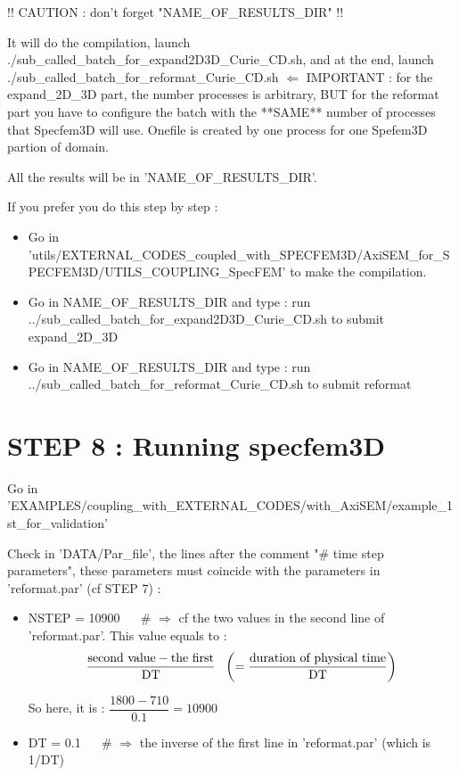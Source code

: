 \documentclass[11pt]{article}
\newcommand{\ds}{\displaystyle}
\begin{document}
\noindent !! CAUTION : don't forget "NAME\_OF\_RESULTS\_DIR" !!

\medskip

\noindent It will do the compilation, launch ./sub\_called\_batch\_for\_expand2D3D\_Curie\_CD.sh, and at the end, launch ./sub\_called\_batch\_for\_reformat\_Curie\_CD.sh $\Longleftarrow$ IMPORTANT : for the expand\_2D\_3D part, the number processes is arbitrary, BUT for the reformat part you have to configure the batch with the **SAME** number of processes that Specfem3D will use. Onefile is created by one process for one Spefem3D partion of domain.

\smallskip

\noindent All the results will be in 'NAME\_OF\_RESULTS\_DIR'.

\bigskip

\noindent If you prefer you do this step by step :

\begin{itemize}

\item[\textbullet] Go in {\scriptsize 'utils/EXTERNAL\_CODES\_coupled\_with\_SPECFEM3D/AxiSEM\_for\_SPECFEM3D/UTILS\_COUPLING\_SpecFEM'} to make the compilation.
\item[\textbullet] Go in NAME\_OF\_RESULTS\_DIR and type : run ../sub\_called\_batch\_for\_expand2D3D\_Curie\_CD.sh to submit expand\_2D\_3D
\item[\textbullet] Go in NAME\_OF\_RESULTS\_DIR and type : run ../sub\_called\_batch\_for\_reformat\_Curie\_CD.sh to submit reformat

\end{itemize}

\section{STEP 8 : Running specfem3D}

\noindent Go in 'EXAMPLES/coupling\_with\_EXTERNAL\_CODES/with\_AxiSEM/example\_1st\_for\_validation'

\medskip 

\noindent Check in 'DATA/Par\_file', the lines after the comment "\# time step parameters", these parameters must coincide with the parameters in  'reformat.par' (cf STEP 7) :

\begin{itemize}

\item[\textbullet] NSTEP = 10900 ~~ \# $\Longrightarrow$ cf the two values in the second line of 'reformat.par'. This value equals to : 
$$\ds \dfrac{\hbox{second value} - \hbox{the first}}{\text{DT}} ~~ \left(= \dfrac{\hbox{duration of physical time}}{\text{DT}} \right)$$

\noindent So here, it is : $\ds \dfrac{1800 - 710}{0.1} = 10900$

\medskip 

\item[\textbullet] DT = 0.1 ~~ \# $\Longrightarrow$ the inverse of the first line in 'reformat.par' (which is 1/DT)

\end{itemize}
\end{document}
